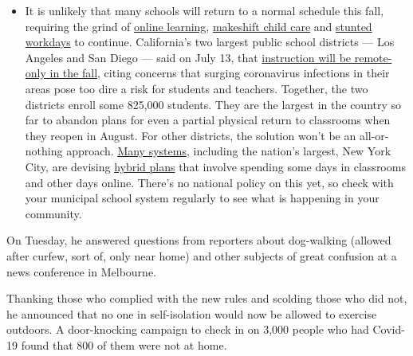 \begin{itemize}
  \begin{itemize}
  \tightlist
  \item
    It is unlikely that many schools will return to a normal schedule
    this fall, requiring the grind of
    \href{https://www.nytimes.com/2020/06/05/us/coronavirus-education-lost-learning.html?action=click\&pgtype=Article\&state=default\&region=MAIN_CONTENT_3\&context=storylines_faq}{online
    learning},
    \href{https://www.nytimes.com/2020/05/29/us/coronavirus-child-care-centers.html?action=click\&pgtype=Article\&state=default\&region=MAIN_CONTENT_3\&context=storylines_faq}{makeshift
    child care} and
    \href{https://www.nytimes.com/2020/06/03/business/economy/coronavirus-working-women.html?action=click\&pgtype=Article\&state=default\&region=MAIN_CONTENT_3\&context=storylines_faq}{stunted
    workdays} to continue. California's two largest public school
    districts --- Los Angeles and San Diego --- said on July 13, that
    \href{https://www.nytimes.com/2020/07/13/us/lausd-san-diego-school-reopening.html?action=click\&pgtype=Article\&state=default\&region=MAIN_CONTENT_3\&context=storylines_faq}{instruction
    will be remote-only in the fall}, citing concerns that surging
    coronavirus infections in their areas pose too dire a risk for
    students and teachers. Together, the two districts enroll some
    825,000 students. They are the largest in the country so far to
    abandon plans for even a partial physical return to classrooms when
    they reopen in August. For other districts, the solution won't be an
    all-or-nothing approach.
    \href{https://bioethics.jhu.edu/research-and-outreach/projects/eschool-initiative/school-policy-tracker/}{Many
    systems}, including the nation's largest, New York City, are
    devising
    \href{https://www.nytimes.com/2020/06/26/us/coronavirus-schools-reopen-fall.html?action=click\&pgtype=Article\&state=default\&region=MAIN_CONTENT_3\&context=storylines_faq}{hybrid
    plans} that involve spending some days in classrooms and other days
    online. There's no national policy on this yet, so check with your
    municipal school system regularly to see what is happening in your
    community.
  \end{itemize}
\end{itemize}

On Tuesday, he answered questions from reporters about dog-walking
(allowed after curfew, sort of, only near home) and other subjects of
great confusion at a news conference in Melbourne.

Thanking those who complied with the new rules and scolding those who
did not, he announced that no one in self-isolation would now be allowed
to exercise outdoors. A door-knocking campaign to check in on 3,000
people who had Covid-19 found that 800 of them were not at home.

